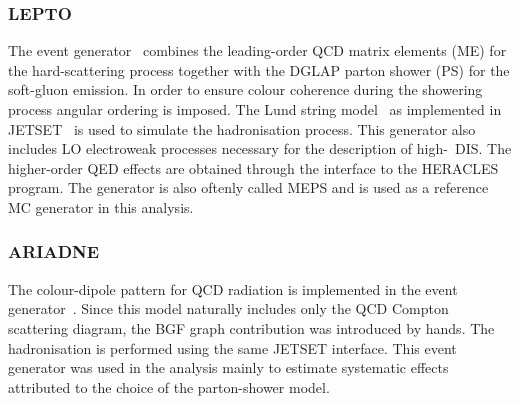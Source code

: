 \subsubsection{LEPTO}
The \lepto event generator~\cite{lepto} combines the leading-order QCD matrix elements (ME) for the hard-scattering process together with the DGLAP parton shower (PS) for the soft-gluon emission. In order to ensure colour coherence during the showering process angular ordering is imposed. The Lund string model~\cite{lund} as implemented in JETSET~\cite{jetset} is used to simulate the hadronisation process. This generator also includes LO electroweak processes necessary for the description of high-\qsq~DIS. The higher-order QED effects are obtained through the interface to the HERACLES~\cite{heracles} program. The \lepto generator is also oftenly called MEPS and is used as a reference MC generator in this analysis.
\subsubsection{ARIADNE}
The colour-dipole pattern for QCD radiation is implemented in the \ariadne event generator~\cite{ariadne}. Since this model naturally includes only the QCD Compton scattering diagram, the BGF graph contribution was introduced by hands. The hadronisation is performed using the same JETSET interface. This event generator was used in the analysis mainly to estimate systematic effects attributed to the choice of the parton-shower model.
